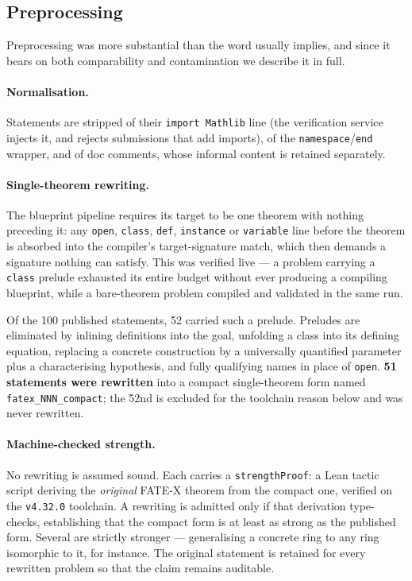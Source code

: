 \documentclass[12pt, a4paper]{article}
\begin{document}
\subsection{Preprocessing}
\label{sec:preprocessing}

Preprocessing was more substantial than the word usually implies, and since
it bears on both comparability and contamination we describe it in full.

\paragraph{Normalisation.} Statements are stripped of their
\texttt{import Mathlib} line (the verification service injects it, and
rejects submissions that add imports), of the
\texttt{namespace}/\texttt{end} wrapper, and of doc comments, whose informal
content is retained separately.

\paragraph{Single-theorem rewriting.} The blueprint pipeline requires its
target to be one theorem with nothing preceding it: any \texttt{open},
\texttt{class}, \texttt{def}, \texttt{instance} or \texttt{variable} line
before the theorem is absorbed into the compiler's target-signature match,
which then demands a signature nothing can satisfy. This was verified live ---
a problem carrying a \texttt{class} prelude exhausted its entire budget
without ever producing a compiling blueprint, while a bare-theorem problem
compiled and validated in the same run.

Of the 100 published statements, 52 carried such a prelude. Preludes are
eliminated by inlining definitions into the goal, unfolding a class into its
defining equation, replacing a concrete construction by a universally
quantified parameter plus a characterising hypothesis, and fully qualifying
names in place of \texttt{open}. \textbf{51 statements were rewritten} into a
compact single-theorem form named \texttt{fatex\_NNN\_compact}; the 52nd is
excluded for the toolchain reason below and was never rewritten.

\paragraph{Machine-checked strength.} No rewriting is assumed sound. Each
carries a \texttt{strengthProof}: a Lean tactic script deriving the
\emph{original} FATE-X theorem from the compact one, verified on the
\texttt{v4.32.0} toolchain. A rewriting is admitted only if that derivation
type-checks, establishing that the compact form is at least as strong as the
published form. Several are strictly stronger --- generalising a concrete
ring to any ring isomorphic to it, for instance. The original statement is
retained for every rewritten problem so that the claim remains auditable.
\end{document}
